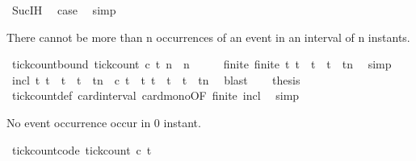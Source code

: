 \begin{isabellebody}
\ Suc{\isachardot}IH\ \isamarkupfalse%
\ {\isacharquery}case\ \isamarkupfalse%
\ simp\isanewline
{}\isamarkupfalse%
%
\endisatagproof
{\isafoldproof}%
%
\isadelimproof
%
\endisadelimproof
%
\begin{isamarkuptext}%
There cannot be more than n occurrences of an event in an interval of n instants.%
\end{isamarkuptext}\isamarkuptrue%
\isamarkupfalse%
\ tick{\isacharunderscore}count{\isacharunderscore}bound{\isacharcolon}\ {\isacartoucheopen}tick{\isacharunderscore}count\ c\ t\ n\ {\isasymle}\ n{\isacartoucheclose}\isanewline
%
\isadelimproof
%
\endisadelimproof
%
\isatagproof
{}\isamarkupfalse%
\ {\isacharminus}\isanewline
\ \ \isamarkupfalse%
\ finite{\isacharcolon}\ {\isacartoucheopen}finite\ {\isacharbraceleft}t{\isachardot}\ t\ {\isasymle}\ t\ {\isasymand}\ t\ {\isacharless}\ tn{\isacharbraceright}{\isacartoucheclose}\ \isamarkupfalse%
\ simp\isanewline
\ \ \isamarkupfalse%
\ incl{\isacharcolon}\ {\isacartoucheopen}{\isacharbraceleft}t{\isachardot}\ t\ {\isasymle}\ t\ {\isasymand}\ t\ {\isacharless}\ tn\ {\isasymand}\ c\ t{\isacharbraceright}\ {\isasymsubseteq}\ {\isacharbraceleft}t{\isachardot}\ t\ {\isasymle}\ t\ {\isasymand}\ t\ {\isacharless}\ tn{\isacharbraceright}{\isacartoucheclose}\ \isamarkupfalse%
\ blast\isanewline
\ \ \isamarkupfalse%
\ {\isacharquery}thesis\ \isamarkupfalse%
\ tick{\isacharunderscore}count{\isacharunderscore}def\ card{\isacharunderscore}interval\ card{\isacharunderscore}mono{\isacharbrackleft}OF\ finite\ incl{\isacharbrackright}\ \isamarkupfalse%
\ simp\isanewline
{}\isamarkupfalse%
%
\endisatagproof
{\isafoldproof}%
%
\isadelimproof
%
\endisadelimproof
%
\begin{isamarkuptext}%
No event occurrence occur in 0 instant.%
\end{isamarkuptext}\isamarkuptrue%
\isamarkupfalse%
\ tick{\isacharunderscore}count{\isacharunderscore}{}{\isacharbrackleft}code{\isacharbrackright}{\isacharcolon}\ {\isacartoucheopen}tick{\isacharunderscore}count\ c\ t\ {}\ {\isacharequal}\ {}{\isacartoucheclose}\isanewline

\end{isabellebody}

